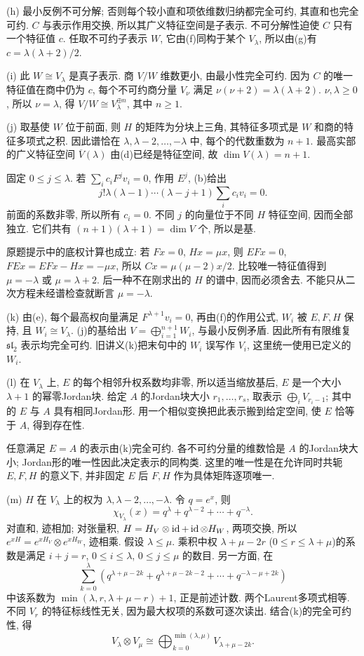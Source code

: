 \begin{solution}
(h) 最小反例不可分解; 否则每个较小直和项依维数归纳都完全可约, 其直和也完全可约. $C$ 与表示作用交换, 所以其广义特征空间是子表示. 不可分解性迫使 $C$ 只有一个特征值 $c$. 任取不可约子表示 $W$, 它由(f)同构于某个 $V_\lambda$, 所以由(g)有 $c=\lambda(\lambda+2)/2$.

(i) 此 $W\cong V_\lambda$ 是真子表示. 商 $V/W$ 维数更小, 由最小性完全可约. 因为 $C$ 的唯一特征值在商中仍为 $c$, 每个不可约商分量 $V_\nu$ 满足 $\nu(\nu+2)=\lambda(\lambda+2)$. $\nu,\lambda\ge0$, 所以 $\nu=\lambda$, 得 $V/W\cong V_\lambda^{\oplus n}$, 其中 $n\ge1$.

(j) 取基使 $W$ 位于前面, 则 $H$ 的矩阵为分块上三角, 其特征多项式是 $W$ 和商的特征多项式之积. 因此谱恰在 $\lambda,\lambda-2,\ldots,-\lambda$ 中, 每个的代数重数为 $n+1$. 最高实部的广义特征空间 $\overline V(\lambda)$ 由(d)已经是特征空间, 故 $\dim V(\lambda)=n+1$.

固定 $0\le j\le\lambda$. 若 $\sum_i c_iF^jv_i=0$, 作用 $E^j$, (b)给出
\[
j!\lambda(\lambda-1)\cdots(\lambda-j+1)\sum_i c_i v_i=0.
\]
前面的系数非零, 所以所有 $c_i=0$. 不同 $j$ 的向量位于不同 $H$ 特征空间, 因而全部独立. 它们共有 $(n+1)(\lambda+1)=\dim V$ 个, 所以是基.

原题提示中的底权计算也成立: 若 $Fx=0$, $Hx=\mu x$, 则 $EFx=0$, $FEx=EFx-Hx=-\mu x$, 所以 $Cx=\mu(\mu-2)x/2$. 比较唯一特征值得到 $\mu=-\lambda$ 或 $\mu=\lambda+2$. 后一种不在刚求出的 $H$ 的谱中, 因而必须舍去. 不能只从二次方程未经谱检查就断言 $\mu=-\lambda$.

(k) 由(e), 每个最高权向量满足 $F^{\lambda+1}v_i=0$, 再由(f)的作用公式, $W_i$ 被 $E,F,H$ 保持, 且 $W_i\cong V_\lambda$. (j)的基给出 $V=\bigoplus_{i=1}^{n+1}W_i$, 与最小反例矛盾. 因此所有有限维复 $\mathfrak{sl}_2$ 表示均完全可约. 旧讲义(k)把末句中的 $W_i$ 误写作 $V_i$, 这里统一使用已定义的 $W_i$.

(l) 在 $V_\lambda$ 上, $E$ 的每个相邻升权系数均非零, 所以适当缩放基后, $E$ 是一个大小 $\lambda+1$ 的幂零Jordan块. 给定 $A$ 的Jordan块大小 $r_1,\ldots,r_s$, 取表示 $\bigoplus_iV_{r_i-1}$; 其中的 $E$ 与 $A$ 具有相同Jordan形. 用一个相似变换把此表示搬到给定空间, 使 $E$ 恰等于 $A$, 得到存在性.

任意满足 $E=A$ 的表示由(k)完全可约. 各不可约分量的维数恰是 $A$ 的Jordan块大小; Jordan形的唯一性因此决定表示的同构类. 这里的唯一性是在允许同时共轭 $E,F,H$ 的意义下, 并非固定 $E$ 后 $F,H$ 作为具体矩阵逐项唯一.

(m) $H$ 在 $V_\lambda$ 上的权为 $\lambda,\lambda-2,\ldots,-\lambda$. 令 $q=e^x$, 则
\[
\chi_{V_\lambda}(x)=q^\lambda+q^{\lambda-2}+\cdots+q^{-\lambda}.
\]
对直和, 迹相加; 对张量积, $H=H_V\otimes\operatorname{id}+\operatorname{id}\otimes H_W$, 两项交换, 所以 $e^{xH}=e^{xH_V}\otimes e^{xH_W}$, 迹相乘. 假设 $\lambda\le\mu$. 乘积中权 $\lambda+\mu-2r$ ($0\le r\le\lambda+\mu$)的系数是满足 $i+j=r$, $0\le i\le\lambda$, $0\le j\le\mu$ 的数目. 另一方面, 在
\[
\sum_{k=0}^{\lambda}
(q^{\lambda+\mu-2k}+q^{\lambda+\mu-2k-2}+\cdots+q^{-\lambda-\mu+2k})
\]
中该系数为 $\min(\lambda,r,\lambda+\mu-r)+1$, 正是前述计数. 两个Laurent多项式相等. 不同 $V_r$ 的特征标线性无关, 因为最大权项的系数可逐次读出. 结合(k)的完全可约性, 得
\[
V_\lambda\otimes V_\mu\cong
\bigoplus_{k=0}^{\min(\lambda,\mu)}V_{\lambda+\mu-2k}.
\]


\end{solution}
